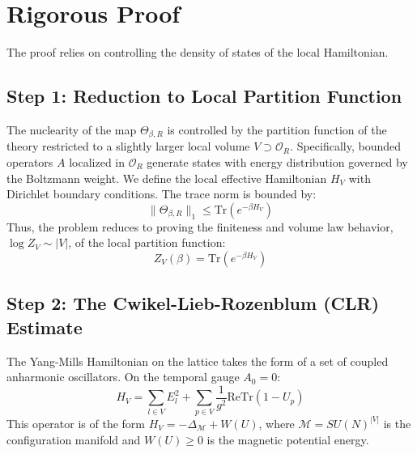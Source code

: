 \section{Rigorous Proof}

The proof relies on controlling the density of states of the local Hamiltonian.

\subsection{Step 1: Reduction to Local Partition Function}
The nuclearity of the map $\Theta_{\beta, R}$ is controlled by the partition function of the theory restricted to a slightly larger local volume $V \supset \mathcal{O}_R$.
Specifically, bounded operators $A$ localized in $\mathcal{O}_R$ generate states with energy distribution governed by the Boltzmann weight.
We define the local effective Hamiltonian $H_V$ with Dirichlet boundary conditions. The trace norm is bounded by:
\begin{equation}
\|\Theta_{\beta, R}\|_1 \le \text{Tr}(e^{-\beta H_V})
\end{equation}
Thus, the problem reduces to proving the finiteness and volume law behavior, $\log Z_V \sim |V|$, of the local partition function:
\begin{equation}
Z_V(\beta) = \text{Tr}(e^{-\beta H_V})
\end{equation}

\subsection{Step 2: The Cwikel-Lieb-Rozenblum (CLR) Estimate}
The Yang-Mills Hamiltonian on the lattice takes the form of a set of coupled anharmonic oscillators. On the temporal gauge $A_0=0$:
\begin{equation}
H_V = \sum_{l \in V} E_l^2 + \sum_{p \in V} \frac{1}{g^2} \text{Re}\text{Tr}(1 - U_p)
\end{equation}
This operator is of the form $H_V = -\Delta_{\mathcal{M}} + W(U)$, where $\mathcal{M} = SU(N)^{|V|}$ is the configuration manifold and $W(U) \ge 0$ is the magnetic potential energy.

